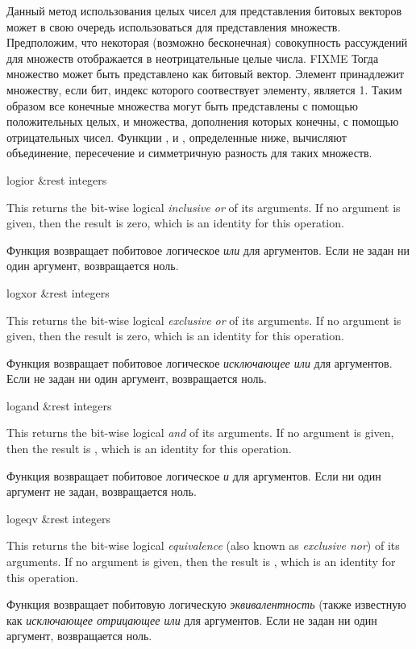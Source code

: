Данный метод использования целых чисел для представления битовых векторов может
в свою очередь использоваться для представления множеств. Предположим, что
некоторая (возможно бесконечная) совокупность рассуждений для множеств отображается
в неотрицательные целые числа. FIXME
Тогда множество может быть представлено как битовый вектор. Элемент принадлежит
множеству, если бит, индекс которого соотвествует элементу, является 1.
Таким образом все конечные множества могут быть представлены с помощью
положительных целых, и множества, дополнения которых конечны, с помощью
отрицательных чисел. Функции ,  и ,
определенные ниже, вычисляют объединение, пересечение и симметричную разность для
таких множеств.

\begin{defun}[Function]
logior &rest integers

This returns the bit-wise logical \emph{inclusive or} of its arguments.
If no argument is given, then the result is zero,
which is an identity for this operation.

Функция возвращает побитовое логическое \emph{или} для аргументов.
Если не задан ни один аргумент, возвращается ноль.
\end{defun}

\begin{defun}[Function]
logxor &rest integers

This returns the bit-wise logical \emph{exclusive or} of its arguments.
If no argument is given, then the result is zero,
which is an identity for this operation.

Функция возвращает побитовое логическое \emph{исключающее или} для аргументов.
Если не задан ни один аргумент, возвращается ноль.
\end{defun}

\begin{defun}[Function]
logand &rest integers

This returns the bit-wise logical \emph{and} of its arguments.
If no argument is given, then the result is ,
which is an identity for this operation.

Функция возвращает побитовое логическое \emph{и} для аргументов.
Если ни один аргумент не задан, возвращается ноль.
\end{defun}

\begin{defun}[Function]
logeqv &rest integers

This returns the bit-wise logical \emph{equivalence} (also known as \emph{exclusive nor})
of its arguments.
If no argument is given, then the result is ,
which is an identity for this operation.

Функция возвращает побитовую логическую \emph{эквивалентность} (также известную
как \emph{исключающее отрицающее или} для аргументов.
Если не задан ни один аргумент, возвращается ноль.
\end{defun}

